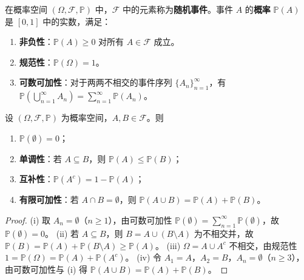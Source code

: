 \begin{definition}[随机事件]\label{def:random_event}
在概率空间 $(\Omega, \mathcal{F}, \mathbb{P})$ 中，$\mathcal{F}$ 中的元素称为\textbf{随机事件}。事件 $A$ 的\textbf{概率} $\mathbb{P}(A)$ 是 $[0,1]$ 中的实数，满足：
\begin{enumerate}[label=(\roman*)]
    \item \textbf{非负性}：$\mathbb{P}(A) \ge 0$ 对所有 $A \in \mathcal{F}$ 成立。
    \item \textbf{规范性}：$\mathbb{P}(\Omega) = 1$。
    \item \textbf{可数可加性}：对于两两不相交的事件序列 $\{A_n\}_{n=1}^{\infty}$，有 $\mathbb{P}(\bigcup_{n=1}^{\infty} A_n) = \sum_{n=1}^{\infty} \mathbb{P}(A_n)$。
\end{enumerate}
\end{definition}

\begin{proposition}[概率测度的基本性质]\label{prop:probability_measure_properties}
设 $(\Omega, \mathcal{F}, \mathbb{P})$ 为概率空间，$A, B \in \mathcal{F}$。则
\begin{enumerate}[label=(\roman*)]
    \item $\mathbb{P}(\emptyset) = 0$；
    \item \textbf{单调性}：若 $A \subseteq B$，则 $\mathbb{P}(A) \le \mathbb{P}(B)$；
    \item \textbf{互补性}：$\mathbb{P}(A^c) = 1 - \mathbb{P}(A)$；
    \item \textbf{有限可加性}：若 $A \cap B = \emptyset$，则 $\mathbb{P}(A \cup B) = \mathbb{P}(A) + \mathbb{P}(B)$。
\end{enumerate}
\end{proposition}

\begin{proof}
(i) 取 $A_n = \emptyset$（$n \ge 1$），由可数可加性 $\mathbb{P}(\emptyset) = \sum_{n=1}^{\infty}\mathbb{P}(\emptyset)$，故 $\mathbb{P}(\emptyset) = 0$。
(ii) 若 $A \subseteq B$，则 $B = A \cup (B \setminus A)$ 为不相交并，故 $\mathbb{P}(B) = \mathbb{P}(A) + \mathbb{P}(B \setminus A) \ge \mathbb{P}(A)$。
(iii) $\Omega = A \cup A^c$ 不相交，由规范性 $1 = \mathbb{P}(\Omega) = \mathbb{P}(A) + \mathbb{P}(A^c)$。
(iv) 令 $A_1 = A$，$A_2 = B$，$A_n = \emptyset$（$n \ge 3$），由可数可加性与 (i) 得 $\mathbb{P}(A \cup B) = \mathbb{P}(A) + \mathbb{P}(B)$。
\end{proof}

